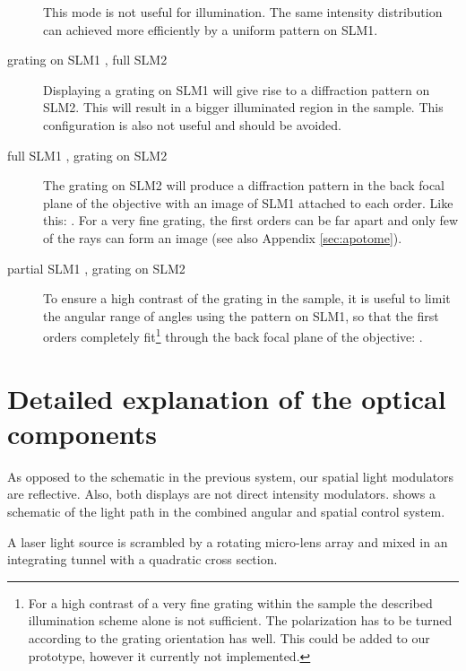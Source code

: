 \begin{description}
  This mode is not useful for illumination. The same intensity
  distribution can achieved more efficiently by a uniform pattern on
  SLM1.
\item[grating on SLM1 \sm{grating-circle}, full SLM2 \sm{full}]
  Displaying a grating on SLM1 will give rise to a diffraction pattern
  on SLM2. This will result in a bigger illuminated region in the
  sample. This configuration is also not useful and should be avoided.
\item[full SLM1 \sm{full}, grating on SLM2 \sm{grating}] The grating
  on SLM2 will produce a diffraction pattern in the back focal plane
  of the objective with an image of SLM1 attached to each order. Like
  this: . For a very fine grating, the first orders can be
  far apart and only few of the rays can form an image (see also
  Appendix \ref{sec:apotome}).
\item[partial SLM1 \sm{half}, grating on SLM2\sm{grating}] To ensure a
  high contrast of the grating in the sample, it is useful to limit
  the angular range of angles using the pattern on SLM1, so that the
  first orders completely fit\footnote{For a high contrast of a very
    fine grating within the sample the described illumination scheme
    alone is not sufficient. The polarization has to be turned
    according to the grating orientation has well. This could be added
    to our prototype, however it currently not implemented.} through
  the back focal plane of the objective: .
\end{description}



\section{Detailed explanation of the optical components}

As opposed to the schematic in the previous system, our spatial light
modulators are reflective.  Also, both displays are not direct
intensity modulators.   shows a schematic of the
light path in the combined angular and spatial control system.

A laser light source is scrambled by a rotating micro-lens array and
mixed in an integrating tunnel with a quadratic cross section.

